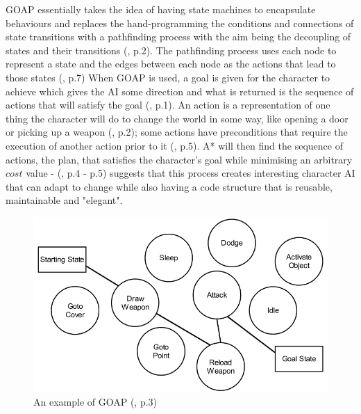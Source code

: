 \documentclass[11pt, a4paper]{article}
\begin{document}
GOAP essentially takes the idea of having state machines to encapsulate behaviours and replaces the hand-programming the conditions and connections of state transitions with a pathfinding process with the aim being the decoupling of states and their transitions (\cite{orkin2003applying}, p.2). The pathfinding process uses each node to represent a state and the edges between each node as the actions that lead to those states (\cite{orkin2003applying}, p.7) When GOAP is used, a goal is given for the character to achieve which gives the AI some direction and what is returned is the sequence of actions that will satisfy the goal (\cite{orkin2003applying}, p.1). An action is a representation of one thing the character will do to change the world in some way, like opening a door or picking up a weapon (\cite{orkin2003applying}, p.2); some actions have preconditions that require the execution of another action prior to it (\cite{orkin2003applying}, p.5). A* will then find the sequence of actions, the plan, that satisfies the character's goal while minimising an arbitrary $cost$ value - \citeauthor{orkin2003applying} (\citeyear{orkin2003applying}, p.4 - p.5) suggests that this process creates interesting character AI that can adapt to change while also having a code structure that is reusable, maintainable and "elegant".

\begin{figure}[h]
  \includegraphics[width=\linewidth]{img/goap_figure_1.png}
  \caption{An example of GOAP (\cite{orkin2003applying}, p.3)}
  \label{fig:goap}
\end{figure}
\end{document}
